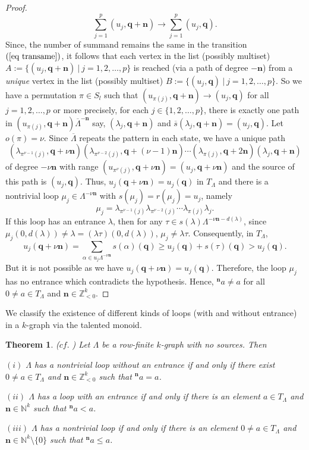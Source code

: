 \documentclass[a4paper,reqno,12pt]{amsart}
\numberwithin{equation}{section}
\newtheorem{thm}{Theorem}[subsection]
\theoremstyle{definition}
\theoremstyle{remark}
\newcommand{\N}{\mathbf{n}}
\begin{document}
\begin{proof}
\begin{equation}\label{eq transame}
\displaystyle{\sum_{j=1}^{p}} (u_j,\mathbf{q}+\N)\longrightarrow \displaystyle{\sum_{j=1}^{p}} (u_j,\mathbf{q}).    
\end{equation}
Since, the number of summand remains the same in the transition $(\ref{eq transame})$, it follows that each vertex in the list (possibly multiset) $A:=\{(u_j,\mathbf{q}+\N)~|~j=1,2,\ldots,p
\}$ is reached (via a path of degree $-\N$) from a \emph{unique} vertex in the list (possibly multiset) $B:=\{(u_j,\mathbf{q})~|~j=1,2,\ldots,p\}$. So we have a permutation $\pi\in S_l$ such that $(u_{\pi(j)},\mathbf{q}+\N)\longrightarrow (u_j,\mathbf{q})$ for all $j=1,2,\ldots,p$ or more precisely, for each $j\in \{1,2,\ldots,p\}$, there is exactly one path in $(u_{\pi(j)},\mathbf{q}+\N)\overline{\Lambda}^{-\N}$ say, $(\lambda_j,\mathbf{q}+\N)$ and $\overline{s}(\lambda_j,\mathbf{q}+\N)=(u_j,\mathbf{q})$. Let $o(\pi)=\nu$. Since $\overline{\Lambda}$ repeats the pattern in each state, we have a unique path \[(\lambda_{\pi^{\nu-1}(j)},\mathbf{q}+\nu \N)(\lambda_{\pi^{\nu-2}(j)},\mathbf{q}+(\nu-1) \N)\cdots (\lambda_{\pi(j)},\mathbf{q}+2 \N)(\lambda_{j},\mathbf{q}+\N)\] of degree $-\nu \N$ with range $(u_{\pi^\nu(j)},\mathbf{q}+\nu\N)=(u_j,\mathbf{q}+\nu \N)$ and the source of this path is $(u_j,\mathbf{q})$. Thus, $u_j(\mathbf{q}+\nu \N)=u_j(\mathbf{q})$ in $T_{\Lambda}$ and there is a nontrivial loop $\mu_j\in \Lambda^{-\nu \N}$ with $s(\mu_j)=r(\mu_j)=u_j$, namely \[\mu_j=\lambda_{\pi^{\nu-1}(j)}\lambda_{\pi^{\nu-2}(j)}\cdots \lambda_{\pi(j)}\lambda_{j}.\] If this loop has an entrance $\lambda$, then for any $\tau\in s(\lambda)\Lambda^{-\nu \N-d(\lambda)}$, since $\mu_j(0,d(\lambda))\neq \lambda=(\lambda\tau)(0,d(\lambda))$, $\mu_j\neq \lambda\tau$. Consequently, in $T_\Lambda$, \[u_j(\mathbf{q}+\nu \N)=\displaystyle{\sum_{\alpha\in u_j\Lambda^{-\nu \N}}} s(\alpha)(\mathbf{q})\ge u_j(\mathbf{q})+s(\tau)(\mathbf{q})> u_j(\mathbf{q}).\] But it is not possible as we have $u_j(\mathbf{q}+\nu \N)=u_j(\mathbf{q})$. Therefore, the loop $\mu_j$ has no entrance which contradicts the hypothesis. Hence, $^\N a\neq a$ for all $0\neq a\in T_\Lambda$ and $\N\in \mathbb{Z}_{<0}^k$. 
\end{proof}

We classify the existence of different kinds of loops (with and without entrance) in a $k$-graph via the talented monoid.
\begin{thm}\label{th characterizing loops via TM}
\textup{($cf.$ \cite[Proposition 4.2]{hazli})} Let $\Lambda$ be a row-finite $k$-graph with no sources. Then

$(i)$ $\Lambda$ has a nontrivial loop without an entrance if and only if there exist $0\neq a\in T_\Lambda$ and $\N\in \mathbb{Z}_{<0}^k$ such that $^\N a=a$.

$(ii)$ $\Lambda$ has a loop with an entrance if and only if there is an element $a\in T_\Lambda$ and $\N\in \mathbb{N}^k$ such that $^\N a< a$. 

$(iii)$ $\Lambda$ has a nontrivial loop if and only if there is an element $0\neq a\in T_\Lambda$ and $\N\in \mathbb{N}^k\setminus \{0\}$ such that $^\N a\le a$. 
\end{thm}
\end{document}
